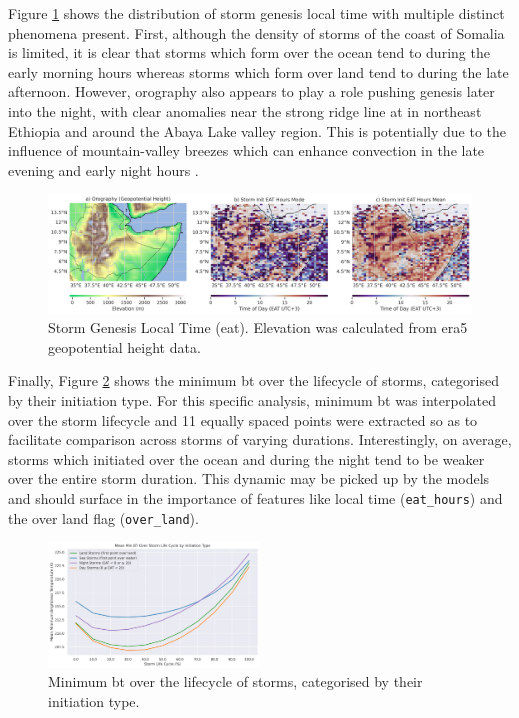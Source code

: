 Figure \ref{fig:orography_storm_init_eat_hours_mode_mean} shows the distribution of storm genesis local time with multiple distinct phenomena present. First, although the density of storms of the coast of Somalia is limited, it is clear that storms which form over the ocean tend to during the early morning hours whereas storms which form over land tend to during the late afternoon. However, orography also appears to play a role pushing genesis later into the night, with clear anomalies near the strong ridge line at  in northeast Ethiopia and around the Abaya Lake valley region. This is potentially due to the influence of mountain-valley breezes which can enhance convection in the late evening and early night hours \citep{ZardiDinoandWhiteman2013}.

\begin{figure}[ht]
    \centering
    \includegraphics[width=\textwidth]{../figures/generated/exploration/orography_storm_init_eat_hours_mode_mean.png}
    \caption{Storm Genesis Local Time (\acrlong{eat}). Elevation was calculated from \acrshort{era5} geopotential height data.}
    \label{fig:orography_storm_init_eat_hours_mode_mean}
\end{figure}

Finally, Figure \ref{fig:min_bt_over_lifecycle_by_init_type} shows the minimum \acrshort{bt} over the lifecycle of storms, categorised by their initiation type. For this specific analysis, minimum \acrshort{bt} was interpolated over the storm lifecycle and 11 equally spaced points were extracted so as to facilitate comparison across storms of varying durations. Interestingly, on average, storms which initiated over the ocean and during the night tend to be weaker over the entire storm duration. This dynamic may be picked up by the models and should surface in the importance of features like local time (\texttt{eat\_hours}) and the over land flag (\texttt{over\_land}). 

\begin{figure}[ht]
    \centering
    \includegraphics[width=0.5\textwidth]{../figures/generated/exploration/min_bt_over_lifecycle_by_init_type.png}
    \caption{Minimum \acrfull{bt} over the lifecycle of storms, categorised by their initiation type.}
    \label{fig:min_bt_over_lifecycle_by_init_type}
\end{figure}

